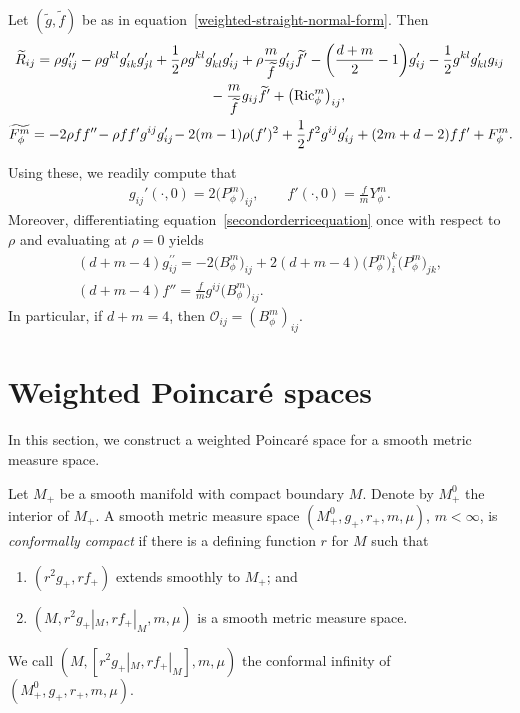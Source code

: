 \documentclass[pdftex]{sigma}
\numberwithin{equation}{section}
\begin{document}
Let $(\widetilde{g},\widetilde{f})$ be as in equation~\eqref{weighted-straight-normal-form}. Then
\begin{gather}
\widetilde{R}_{ij}=\rho g''_{ij}-\rho g^{kl}g'_{ik}g'_{jl}+\frac{1}{2}\rho g^{kl}g'_{kl}g'_{ij}+\rho\frac{m}{\widetilde{f}} g_{ij}'\widetilde{f}'
-\biggl(\frac{d+m}{2}-1\biggr)g'_{ij}-\frac{1}{2}g^{kl}g'_{kl}g_{ij}\nonumber
\\ \hphantom{\widetilde{R}_{ij}=}
{}-\frac{m}{\widetilde{f}}g_{ij}\widetilde{f}'+\big(\mathrm{Ric}_{\phi}^m\big)_{ij},\nonumber
\\
\widetilde{F_\phi^m}=-2\rho f f''\!-\rho ff'g^{ij}g'_{ij}\!-2(m-1)\rho(f')^2
 +\frac{1}{2}f^2g^{ij}g'_{ij}+(2m+d-2)ff'+F_\phi^m.\!
\label{secondorderricequation}
\end{gather}

Using these, we readily compute that
\begin{align*}
g_{ij}'(\cdot,0)=2 \big(P_\phi^m\big)_{ij},\qquad
f'(\cdot,0)=\frac{f}{m}Y_\phi^m.
\end{align*}
Moreover, differentiating equation~\eqref{secondorderricequation} once with respect to $\rho$ and evaluating at $\rho=0$ yields
\begin{gather*}
(d+m-4) g_{i j}^{\prime \prime}=-2\big(B_\phi^m\big)_{i j}+2(d+m-4) \big(P_\phi^m\big)_{i}^{k} \big(P_\phi^m\big)_{j k},
\\
(d+m-4)f''= \frac{f}{m}g^{ij}\big(B_\phi^m\big)_{ij}.
\end{gather*}
In particular, if $d+m=4$, then $\mathcal{O}_{ij}=(B_\phi^m)_{ij}$.

\section{Weighted Poincar\'e spaces}
\label{sec:poincare}

In this section, we construct a weighted Poincar\'e space for a smooth metric measure space.

Let $M_+$ be a smooth manifold with compact boundary $M$. Denote by $M^0_+$ the interior of $M_+$. A smooth metric measure space $(M^0_+,g_+,r_+,m,\mu)$, $m<\infty$, is \emph{conformally compact} if there is a defining function $r$ for $M$ such that
\begin{enumerate}[label=$(\roman*)$]\itemsep=0pt
 \item $(r^2g_+,rf_+)$ extends smoothly to $M_+$; and
 \item $({M,r^2 g_+}|_{M},{rf_+}|_{M},m,\mu)$ is a smooth metric measure space.
\end{enumerate} We call $(M,[{r^2 g_+}|_{M},{rf_+}|_{M}],m,\mu)$ the conformal infinity of $(M^0_+,g_+,r_+,m,\mu)$.
\end{document}
